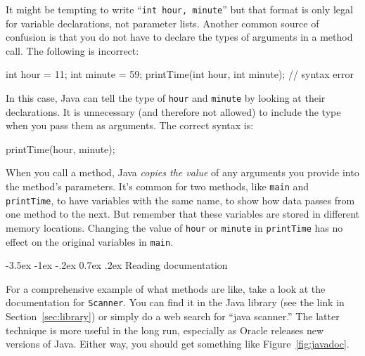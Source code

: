 \documentclass[12pt]{book}
\makeatletter
\theoremstyle{exercise}
\newcommand{\java}[1]{\verb"#1"}
\renewcommand{\section}{\@startsection{section}{1}{\z@}%
    {-3.5ex \@plus -1ex \@minus -.2ex}%
    {0.7ex \@plus.2ex}%
    {\normalfont\Large\bfseries}}
\newcommand{\java}[1]{\lstinline{#1}} %
\makeatother
\begin{document}
It might be tempting to write ``\java{int hour, minute}'' but that format is only legal for variable declarations, not parameter lists.
Another common source of confusion is that you do not have to declare the types of arguments in a method call.
The following is incorrect:

\begin{code}
    int hour = 11;
    int minute = 59;
    printTime(int hour, int minute);  // syntax error
\end{code}

In this case, Java can tell the type of \java{hour} and \java{minute} by looking at their declarations.
It is unnecessary (and therefore not allowed) to include the type when you pass them as arguments.
The correct syntax is:

\begin{code}
    printTime(hour, minute);
\end{code}

When you call a method, Java {\it copies the value} of any arguments you provide into the method's parameters.
It's common for two methods, like \java{main} and \java{printTime}, to have variables with the same name, to show how data passes from one method to the next.
But remember that these variables are stored in different memory locations.
Changing the value of \java{hour} or \java{minute} in \java{printTime} has no effect on the original variables in \java{main}.


\section{Reading documentation}
\label{sec:apidocs}


For a comprehensive example of what methods are like, take a look at the documentation for \java{Scanner}.
You can find it in the Java library (see the link in Section~\ref{sec:library}) or simply do a web search for ``java scanner.''
The latter technique is more useful in the long run, especially as Oracle releases new versions of Java.
Either way, you should get something like Figure~\ref{fig:javadoc}.
\end{document}
